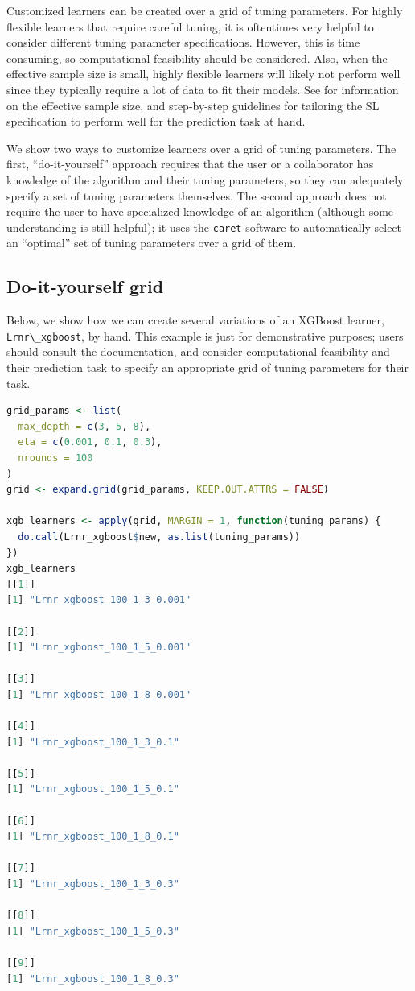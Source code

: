 \documentclass[
  12pt, krantz2,
]{krantz}
\newcommand{\passthrough}[1]{#1}
\newcommand{\1}{\mathbbm{1}}
\theoremstyle{definition}
\theoremstyle{definition}
\theoremstyle{definition}
\theoremstyle{definition}
\theoremstyle{remark}
\begin{document}
Customized learners can be created over a grid of tuning parameters. For
highly flexible learners that require careful tuning, it is oftentimes
very helpful to consider different tuning parameter specifications. However,
this is time consuming, so computational feasibility should be considered.
Also, when the effective sample size is small, highly flexible learners
will likely not perform well since they typically require a lot of data to fit
their models. See \citet{rvp2022super} for information on the effective sample size,
and step-by-step guidelines for tailoring the SL specification to perform well
for the prediction task at hand.

We show two ways to customize learners over a grid of tuning parameters. The
first, ``do-it-yourself'' approach requires that the user or a collaborator has
knowledge of the algorithm and their tuning parameters, so they can adequately
specify a set of tuning parameters themselves. The second approach does not
require the user to have specialized knowledge of an algorithm (although some
understanding is still helpful); it uses the \passthrough{\lstinline!caret!} software to automatically
select an ``optimal'' set of tuning parameters over a grid of them.

\hypertarget{do-it-yourself-grid}{%
\subsection{Do-it-yourself grid}\label{do-it-yourself-grid}}

Below, we show how we can create several variations of an XGBoost learner,
\passthrough{\lstinline!Lrnr\_xgboost!}, by hand. This example is just for demonstrative purposes; users
should consult the documentation, and consider computational feasibility and
their prediction task to specify an appropriate grid of tuning parameters for
their task.

\begin{lstlisting}[language=R]
grid_params <- list(
  max_depth = c(3, 5, 8),
  eta = c(0.001, 0.1, 0.3),
  nrounds = 100
)
grid <- expand.grid(grid_params, KEEP.OUT.ATTRS = FALSE)

xgb_learners <- apply(grid, MARGIN = 1, function(tuning_params) {
  do.call(Lrnr_xgboost$new, as.list(tuning_params))
})
xgb_learners
[[1]]
[1] "Lrnr_xgboost_100_1_3_0.001"

[[2]]
[1] "Lrnr_xgboost_100_1_5_0.001"

[[3]]
[1] "Lrnr_xgboost_100_1_8_0.001"

[[4]]
[1] "Lrnr_xgboost_100_1_3_0.1"

[[5]]
[1] "Lrnr_xgboost_100_1_5_0.1"

[[6]]
[1] "Lrnr_xgboost_100_1_8_0.1"

[[7]]
[1] "Lrnr_xgboost_100_1_3_0.3"

[[8]]
[1] "Lrnr_xgboost_100_1_5_0.3"

[[9]]
[1] "Lrnr_xgboost_100_1_8_0.3"
\end{lstlisting}
\end{document}
